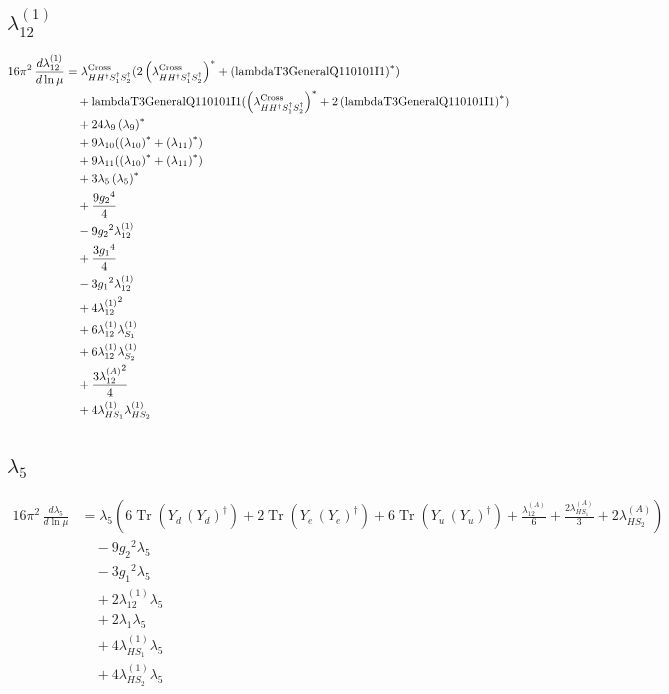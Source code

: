 \documentclass[10pt,a4paper]{article}
\begin{document}
\subsection*{$\lambda_{12}^{(1)}$}
\begin{align*}
16\pi^2\,\frac{d \lambda_{12}^{(1)}}{d\ln\mu} &={\lambda_{H H^\dagger S_1^\dagger S_2^\dagger}^{\rm Cross}} (2 \left({\lambda_{H H^\dagger S_1^\dagger S_2^\dagger}^{\rm Cross}}\right)^{*}+\left(\text{lambdaT3GeneralQ110101I1}\right)^{*}) \\
&\quad +\text{lambdaT3GeneralQ110101I1} (\left({\lambda_{H H^\dagger S_1^\dagger S_2^\dagger}^{\rm Cross}}\right)^{*}+2 \left(\text{lambdaT3GeneralQ110101I1}\right)^{*}) \\
&\quad +24 {\lambda_{9}} \left({\lambda_{9}}\right)^{*} \\
&\quad +9 {\lambda_{10}} (\left({\lambda_{10}}\right)^{*}+\left({\lambda_{11}}\right)^{*}) \\
&\quad +9 {\lambda_{11}} (\left({\lambda_{10}}\right)^{*}+\left({\lambda_{11}}\right)^{*}) \\
&\quad +3 {\lambda_5} \left({\lambda_5}\right)^{*} \\
&\quad +\frac{9 {g_2}^4}{4} \\
&\quad -9 {g_2}^2 {\lambda_{12}^{(1)}} \\
&\quad +\frac{3 {g_1}^4}{4} \\
&\quad -3 {g_1}^2 {\lambda_{12}^{(1)}} \\
&\quad +4 {\lambda_{12}^{(1)}}^2 \\
&\quad +6 {\lambda_{12}^{(1)}} {\lambda_{S_1}^{(1)}} \\
&\quad +6 {\lambda_{12}^{(1)}} {\lambda_{S_2}^{(1)}} \\
&\quad +\frac{3 {\lambda_{12}^{(A)}}^2}{4} \\
&\quad +4 {\lambda_{HS_1}^{(1)}} {\lambda_{HS_2}^{(1)}} \\
\end{align*}
\subsection*{$\lambda_5$}
\begin{align*}
16\pi^2\,\frac{d \lambda_5}{d\ln\mu} &={\lambda_5} \left(6 \operatorname{Tr}\!\left({Y_d}\,\left({Y_d}\right)^{\dagger}\right)+2 \operatorname{Tr}\!\left({Y_e}\,\left({Y_e}\right)^{\dagger}\right)+6 \operatorname{Tr}\!\left({Y_u}\,\left({Y_u}\right)^{\dagger}\right)+\frac{{\lambda_{12}^{(A)}}}{6}+\frac{2 {\lambda_{HS_1}^{(A)}}}{3}+2 {\lambda_{HS_2}^{(A)}}\right) \\
&\quad -9 {g_2}^2 {\lambda_5} \\
&\quad -3 {g_1}^2 {\lambda_5} \\
&\quad +2 {\lambda_{12}^{(1)}} {\lambda_5} \\
&\quad +2 {\lambda_1} {\lambda_5} \\
&\quad +4 {\lambda_{HS_1}^{(1)}} {\lambda_5} \\
&\quad +4 {\lambda_{HS_2}^{(1)}} {\lambda_5} \\
\end{align*}
\end{document}

